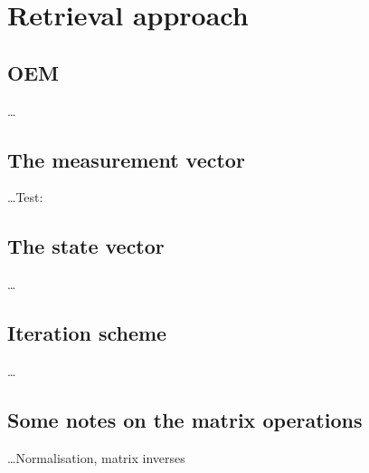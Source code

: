 \chapter{Retrieval approach}
\label{chapter:retrieval}

\section{OEM}
\label{sec:oem}
%
\dots


\section{The measurement vector}
\label{sec:y}
%
\dots Test: \MsrVct


\section{The state vector}
\label{sec:x}
%
\dots


\section{Iteration scheme}
\label{sec:ml}
%
\dots


\section{Some notes on the matrix operations}
\label{sec:matrixops}
%
\dots Normalisation, matrix inverses





